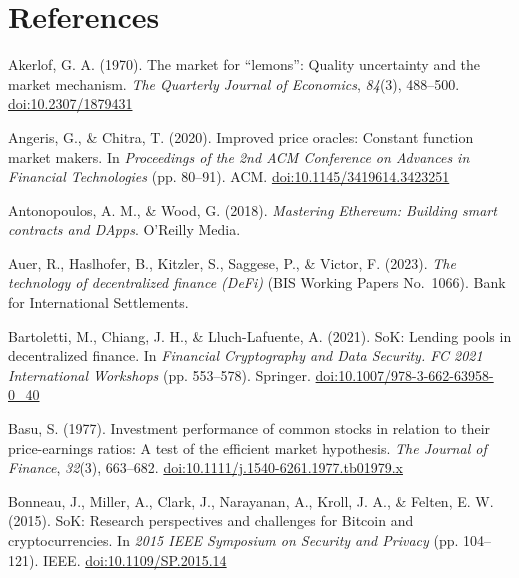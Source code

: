 \clearpage
\chapter{References}
\label{ch:references}

\begin{enumerate}[label={[\arabic*]}, leftmargin=*, itemsep=0.35em, parsep=0pt]
  \item{}\label{ref:1} Akerlof, G. A. (1970). The market for ``lemons'': Quality uncertainty and the market mechanism. \textit{The Quarterly Journal of Economics}, \textit{84}(3), 488--500. \href{https://doi.org/10.2307/1879431}{doi:10.2307/1879431}
  \item{}\label{ref:2} Angeris, G., \& Chitra, T. (2020). Improved price oracles: Constant function market makers. In \textit{Proceedings of the 2nd ACM Conference on Advances in Financial Technologies} (pp. 80--91). ACM. \href{https://doi.org/10.1145/3419614.3423251}{doi:10.1145/3419614.3423251}
  \item{}\label{ref:3} Antonopoulos, A. M., \& Wood, G. (2018). \textit{Mastering Ethereum: Building smart contracts and DApps}. O'Reilly Media.
  \item{}\label{ref:4} Auer, R., Haslhofer, B., Kitzler, S., Saggese, P., \& Victor, F. (2023). \textit{The technology of decentralized finance (DeFi)} (BIS Working Papers No.\ 1066). Bank for International Settlements.
  \item{}\label{ref:5} Bartoletti, M., Chiang, J. H., \& Lluch-Lafuente, A. (2021). SoK: Lending pools in decentralized finance. In \textit{Financial Cryptography and Data Security. FC 2021 International Workshops} (pp. 553--578). Springer. \href{https://doi.org/10.1007/978-3-662-63958-0_40}{doi:10.1007/978-3-662-63958-0\_40}
  \item{}\label{ref:6} Basu, S. (1977). Investment performance of common stocks in relation to their price-earnings ratios: A test of the efficient market hypothesis. \textit{The Journal of Finance}, \textit{32}(3), 663--682. \href{https://doi.org/10.1111/j.1540-6261.1977.tb01979.x}{doi:10.1111/j.1540-6261.1977.tb01979.x}
  \item{}\label{ref:7} Bonneau, J., Miller, A., Clark, J., Narayanan, A., Kroll, J. A., \& Felten, E. W. (2015). SoK: Research perspectives and challenges for Bitcoin and cryptocurrencies. In \textit{2015 IEEE Symposium on Security and Privacy} (pp. 104--121). IEEE. \href{https://doi.org/10.1109/SP.2015.14}{doi:10.1109/SP.2015.14}

\end{enumerate}

